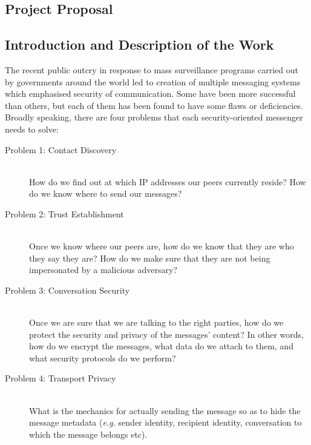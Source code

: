 \documentclass[a4paper, 12pt]{report}
\begin{document}
\begin{appendices}
\chapter{Project Proposal}
\label{appendix:proposal}
\section{Introduction and Description of the Work}
\label{intro}
The recent public outcry in response to mass surveillance programs carried out by governments around the world led to creation of multiple messaging systems which emphasised security of communication. Some have been more successful than others, but each of them has been found to have some flaws or deficiencies. Broadly speaking, there are four problems that each security-oriented messenger needs to solve:
\begin{description}
    \item[Problem 1: Contact Discovery] \hfill \\
        How do we find out at which IP addresses our peers currently reside? How do we know where to send our messages?
    \item[Problem 2: Trust Establishment]\hfill \\
        Once we know where our peers are, how do we know that they are who they say they are? How do we make sure that they are not being impersonated by a malicious adversary?
    \item[Problem 3: Conversation Security]\hfill \\
        Once we are sure that we are talking to the right parties, how do we protect the security and privacy of the messages' content? In other words, how do we encrypt the messages, what data do we attach to them, and what security protocols do we perform?
    \item[Problem 4: Transport Privacy]\hfill \\
        What is the mechanics for actually sending the message so as to hide the message metadata (\textit{e.g.} sender identity, recipient identity, conversation to which the message belongs etc).
\end{description}


\end{appendices}
\end{document}
